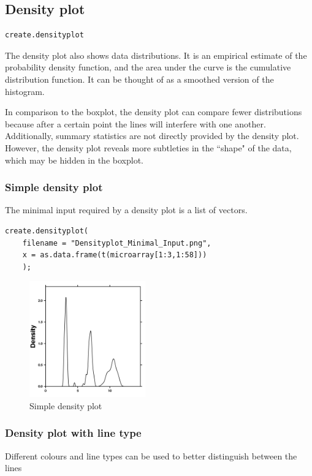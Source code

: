 \documentclass[letterpaper]{article}
\begin{document}
\subsection{Density plot}
\begin{verbatim}
create.densityplot
\end{verbatim}

The density plot also shows data distributions. It is an empirical estimate of the probability density function, and the area under the curve is the cumulative distribution function. It can be thought of as a smoothed version of the histogram.

In comparison to the boxplot, the density plot can compare fewer distributions because after a certain point the lines will interfere with one another. Additionally, summary statistics are not directly provided by the density plot. However, the density plot reveals more subtleties in the ``shape" of the data, which may be hidden in the boxplot.

\subsubsection{Simple density plot}
The minimal input required by a density plot is a list of vectors.

\begin{verbatim}
create.densityplot(
    filename = "Densityplot_Minimal_Input.png",
    x = as.data.frame(t(microarray[1:3,1:58]))
    );
\end{verbatim}

\begin{figure}[!ht]
  \begin{center}
     \includegraphics[width=50mm]{Figures/Densityplot_Minimal_Input.png}
     \caption{Simple density plot}
  \end{center}
\end{figure}

\subsubsection{Density plot with line type}
Different colours and line types can be used to better distinguish between the lines
\end{document}
